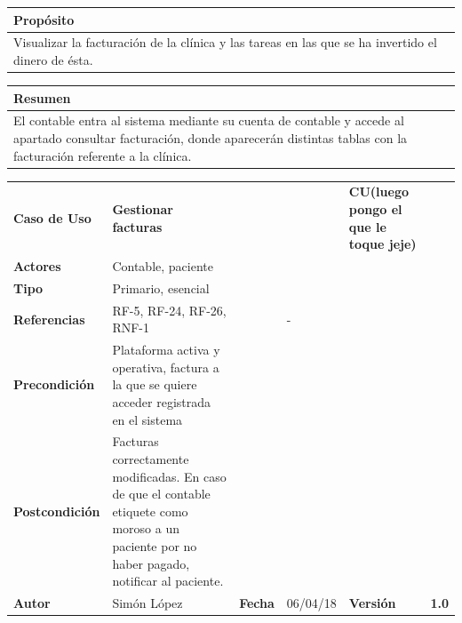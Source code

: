 \documentclass[11pt,a4paper]{article}
\begin{document}
\begin{table}[h]
	\centering
	\begin{tabular}{l}
		\hline
		\multicolumn{1}{|l|}{Propósito} \\ \hline
		Visualizar la facturación de la clínica y las tareas en las que se ha invertido el dinero de ésta.
	\end{tabular}
\end{table}

\begin{table}[h]
	\centering
	\begin{tabular}{l}
		\hline
		\multicolumn{1}{|l|}{Resumen} \\ \hline
		El contable entra al sistema mediante su cuenta de contable y accede al apartado consultar facturación, donde aparecerán distintas tablas con la facturación referente a la clínica.
	\end{tabular}
\end{table}





\begin{table}[h]
	\centering
	\begin{tabular}{|l|lllll}
		\cline{1-1} \cline{6-6}
		\textbf{Caso de Uso}   & \textbf{Gestionar facturas} &   &  & \multicolumn{1}{l|}{\textbf{\textbf{CU(luego pongo el que le toque jeje)}}}        & \multicolumn{1}{l|}{\textbf{}} \\ \cline{1-1} \cline{6-6} 
		\textbf{Actores}       & Contable, paciente &                                     &                       &                                       & \textbf{}                      \\ \cline{1-1}
		\textbf{Tipo}          & Primario, esencial  &                                     &                       &                                       & \textbf{}                      \\ \cline{1-1}
		\textbf{Referencias}   & RF-5, RF-24, RF-26, RNF-1                         &     & -                     &                                       & \textbf{}                      \\ \cline{1-1}
		\textbf{Precondición}  & Plataforma activa y operativa, factura a la que se quiere acceder registrada en el sistema         &                      &                & \textbf{}                      \\ \cline{1-1}
		\textbf{Postcondición} & Facturas correctamente modificadas. En caso de que el contable etiquete como moroso a un paciente por no haber pagado, notificar al paciente.     &      &      &       &         \\ \cline{1-1} \cline{3-3} \cline{5-5}
		\textbf{Autor}         & \multicolumn{1}{l|}{Simón López} & \multicolumn{1}{l|}{\textbf{Fecha}} & \multicolumn{1}{l|}{06/04/18} & \multicolumn{1}{l|}{\textbf{Versión}} & \textbf{1.0}                      \\ \cline{1-1} \cline{3-3} \cline{5-5}
	\end{tabular}
\end{table}
\end{document}
